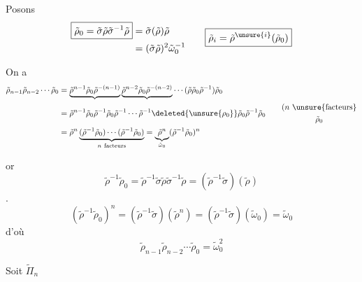 Posons
\[
\begin{aligned}
\boxed{\tilde\rho_0=\tilde\sigma\tilde\rho\tilde\sigma^{-1}\tilde\rho}
&=\tilde\sigma(\tilde\rho)\tilde\rho\\
&=(\tilde\sigma\tilde\rho)^2\tilde\omega_0^{-1}
\end{aligned}
\qquad
\boxed{\tilde\rho_i=\tilde\rho^{\unsure{i}}(\tilde\rho_0)}
\]

On a
\[
\begin{aligned}
\tilde\rho_{n-1}\tilde\rho_{n-2}\cdots\tilde\rho_0
&=\underbrace{\tilde\rho^{n-1}\tilde\rho_0\tilde\rho^{-(n-1)}}
\underbrace{\tilde\rho^{n-2}\tilde\rho_0\tilde\rho^{-(n-2)}}
\cdots(\tilde\rho\tilde\rho_0\tilde\rho^{-1})\tilde\rho_0\\
&=\tilde\rho^{n-1}\tilde\rho_0\tilde\rho^{-1}\tilde\rho_0\tilde\rho^{-1}
\cdots\tilde\rho^{-1}\deleted{\unsure{\rho_0}}\tilde\rho_0\tilde\rho^{-1}\tilde\rho_0
\qquad\begin{gathered}(n\ \text{\unsure{facteurs}}\\\tilde\rho_0\end{gathered}\\
&=\tilde\rho^n\underbrace{(\tilde\rho^{-1}\tilde\rho_0)\cdots(\tilde\rho^{-1}\tilde\rho_0)}_{n\ \text{facteurs}}
=\underbrace{\tilde\rho^n}_{\tilde\omega_0}(\tilde\rho^{-1}\tilde\rho_0)^n
\end{aligned}
\]

or
\[
\tilde\rho^{-1}\tilde\rho_0
=\tilde\rho^{-1}\tilde\sigma\tilde\rho\tilde\sigma^{-1}\tilde\rho
=(\tilde\rho^{-1}\tilde\sigma)(\tilde\rho)
\]
. 
\[
(\tilde\rho^{-1}\tilde\rho_0)^n
=(\tilde\rho^{-1}\tilde\sigma)(\tilde\rho^n)
=(\tilde\rho^{-1}\tilde\sigma)(\tilde\omega_0)
=\tilde\omega_0
\]
d'où
\[
\boxed{\tilde\rho_{n-1}\tilde\rho_{n-2}\cdots\tilde\rho_0=\tilde\omega_0^2}
\]

Soit $\widetilde\Pi_n$


